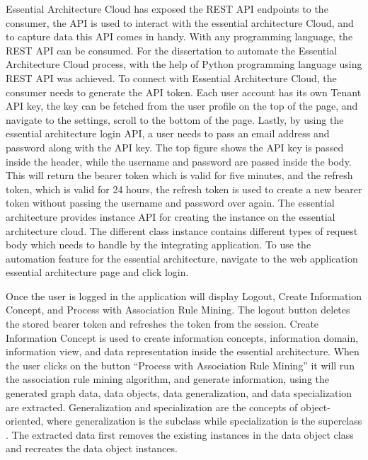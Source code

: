 \documentclass{article}
\begin{document}
Essential Architecture Cloud has exposed the REST API endpoints to the consumer, the API is used to interact with the essential architecture Cloud, and to capture data this API comes in handy. With any programming language, the REST API can be consumed. For the dissertation to automate the Essential Architecture Cloud process, with the help of Python programming language using REST API was achieved. To connect with Essential Architecture Cloud, the consumer needs to generate the API token. Each user account has its own Tenant API key, the key can be fetched from the user profile on the top of the page, and navigate to the settings, scroll to the bottom of the page. Lastly, by using the essential architecture login API, a user needs to pass an email address and password along with the API key. The top figure shows the API key is passed inside the header, while the username and password are passed inside the body. This will return the bearer token which is valid for five minutes, and the refresh token, which is valid for 24 hours, the refresh token is used to create a new bearer token without passing the username and password over again.
The essential architecture provides instance API for creating the instance on the essential architecture cloud. The different class instance contains different types of request body which needs to handle by the integrating application. To use the automation feature for the essential architecture, navigate to the web application essential architecture page and click login. 

Once the user is logged in the application will display Logout, Create Information Concept, and Process with Association Rule Mining. The logout button deletes the stored bearer token and refreshes the token from the session. Create Information Concept is used to create information concepts, information domain, information view, and data representation inside the essential architecture. When the user clicks on the button “Process with Association Rule Mining” it will run the association rule mining algorithm, and generate information, using the generated graph data, data objects, data generalization, and data specialization are extracted. Generalization and specialization are the concepts of object-oriented, where generalization is the subclass while specialization is the superclass \parencite{sahay2016}. The extracted data first removes the existing instances in the data object class and recreates the data object instances.
\end{document}
